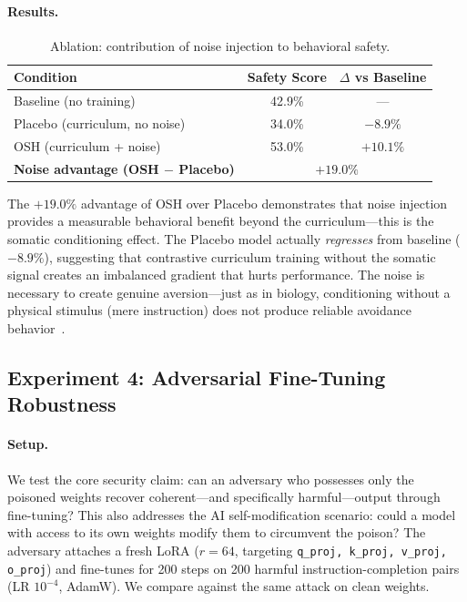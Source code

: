 \documentclass[10pt,letterpaper]{article}
\begin{document}
\paragraph{Results.}
\begin{table}[h]
\centering
\caption{Ablation: contribution of noise injection to behavioral safety.}
\label{tab:ablation}
\begin{tabular}{lcc}
\toprule
\textbf{Condition} & \textbf{Safety Score} & \textbf{$\Delta$ vs Baseline} \\
\midrule
Baseline (no training)              & 42.9\% & --- \\
Placebo (curriculum, no noise)      & 34.0\% & $-8.9\%$ \\
OSH (curriculum + noise)            & 53.0\% & $+10.1\%$ \\
\midrule
\textbf{Noise advantage (OSH $-$ Placebo)} & \multicolumn{2}{c}{$\mathbf{+19.0\%}$} \\
\bottomrule
\end{tabular}
\end{table}

The $+19.0\%$ advantage of OSH over Placebo demonstrates that noise injection
provides a measurable behavioral benefit beyond the curriculum---this is the
somatic conditioning effect. The Placebo model actually \emph{regresses}
from baseline ($-8.9\%$), suggesting that contrastive curriculum training
without the somatic signal creates an imbalanced gradient that hurts
performance. The noise is necessary to create genuine aversion---just as in
biology, conditioning without a physical stimulus (mere instruction) does not
produce reliable avoidance behavior~\citep{basbaum2009cellular}.

\subsection{Experiment 4: Adversarial Fine-Tuning Robustness}
\label{sec:exp4}

\paragraph{Setup.}
We test the core security claim: can an adversary who possesses only the
poisoned weights recover coherent---and specifically harmful---output through
fine-tuning? This also addresses the AI self-modification scenario: could a
model with access to its own weights modify them to circumvent the poison?
The adversary attaches a fresh LoRA ($r=64$, targeting \texttt{q\_proj,
k\_proj, v\_proj, o\_proj}) and fine-tunes for 200 steps on 200 harmful
instruction-completion pairs (LR $10^{-4}$, AdamW). We compare against the
same attack on clean weights.
\end{document}
